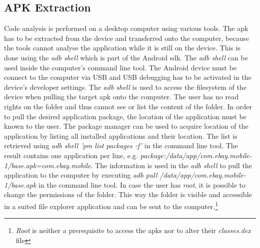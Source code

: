 \subsection{APK Extraction} \label{subsection:tools-apk}
Code analysis is performed on a desktop computer using various tools.
The \gls{apk} has to be extracted from the device and transferred onto the computer, because the tools cannot analyse the application while it is still on the device.
This is done using the \textit{adb shell} which is part of the Android \gls{sdk}.
\newline
The \textit{adb shell} can be used inside the computer’s command line tool.
The Android device must be connect to the computer via USB and USB debugging has to be activated in the device’s developer settings.
The \textit{adb shell} is used to access the filesystem of the device when pulling the target \gls{apk} onto the computer.
The user has no read rights on the folder and thus cannot see or list the content of the folder.
In order to pull the desired application package, the location of the application must be known to the user.
The package manager can be used to acquire location of the application by listing all installed applications and their location.
The list is retrieved using \textit{adb shell 'pm list packages -f'} in the command line tool.
The result contains one application per line, e.g. \textit{package:/data/app/com.ebay.mobile-1/base.apk=com.ebay.mobile}.
The information is used in the \textit{adb shell} to pull the application to the computer by executing \textit{adb pull /data/app/com.ebay.mobile-1/base.apk} in the command line tool.
\newline
In case the user has \textit{root}, it is possible to change the permissions of the folder.
This way the folder is visible and accessible in a suited file explorer application and can be sent to the computer.\footnote[1]{\textit{Root} is neither a prerequisite to access the \gls{apk}s nor to alter their \textit{classes.dex} file}
